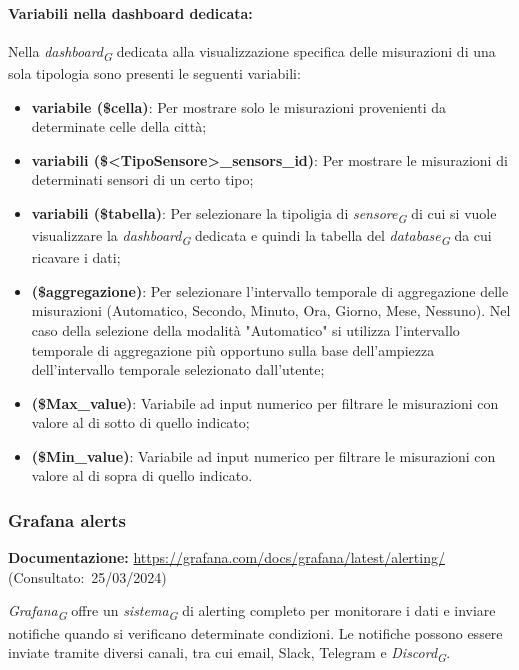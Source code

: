 \paragraph*{Variabili nella dashboard dedicata:} \label{sec:var_dedicate}
Nella \textit{dashboard}\textsubscript{\textit{G}} dedicata alla visualizzazione specifica delle misurazioni di una sola tipologia sono presenti le seguenti variabili:
\begin{itemize}
    \item \textbf{variabile (\$cella)}: Per mostrare solo le misurazioni provenienti da determinate celle della città;
    \item \textbf{variabili (\$<TipoSensore>\_sensors\_id)}: Per mostrare le misurazioni di determinati sensori di un certo tipo;
    \item \textbf{variabili (\$tabella)}: Per selezionare la tipoligia di \textit{sensore}\textsubscript{\textit{G}} di cui si vuole visualizzare la \textit{dashboard}\textsubscript{\textit{G}} dedicata e quindi la tabella del \textit{database}\textsubscript{\textit{G}} da cui ricavare i dati;
    \item \textbf{(\$aggregazione)}: Per selezionare l'intervallo temporale di aggregazione delle misurazioni
    (Automatico, Secondo, Minuto, Ora, Giorno, Mese, Nessuno).
    Nel caso della selezione della modalità "Automatico" si utilizza l'intervallo temporale di aggregazione più opportuno sulla base dell'ampiezza dell'intervallo temporale selezionato dall'utente;
    \item \textbf{(\$Max\_value)}: Variabile ad input numerico per filtrare le misurazioni con valore al di sotto di quello indicato;
    \item \textbf{(\$Min\_value)}: Variabile ad input numerico per filtrare le misurazioni con valore al di sopra di quello indicato.
\end{itemize}



\subsubsection{Grafana alerts}
\textbf{Documentazione:}
\url{https://grafana.com/docs/grafana/latest/alerting/} (Consultato:~25/03/2024)

\textit{Grafana}\textsubscript{\textit{G}} offre un \textit{sistema}\textsubscript{\textit{G}} di alerting completo per monitorare i dati e inviare notifiche quando si verificano determinate condizioni. Le notifiche possono essere inviate tramite diversi canali, tra cui email, Slack, Telegram e \textit{Discord}\textsubscript{\textit{G}}.

